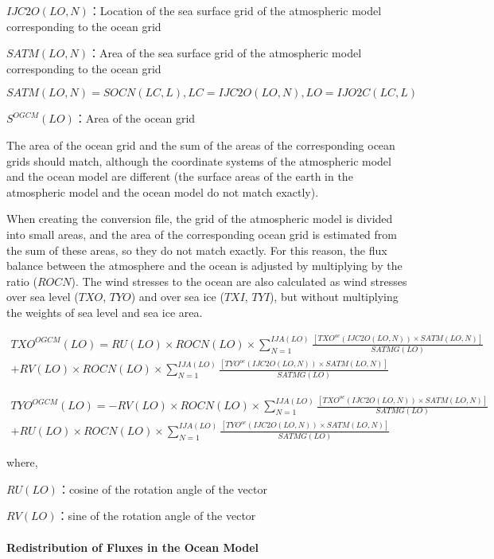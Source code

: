 \(IJC2O(LO,N)\)：Location of the sea surface grid of the atmospheric
model corresponding to the ocean grid

\(SATM(LO,N)\)：Area of the sea surface grid of the atmospheric model
corresponding to the ocean grid

\(SATM(LO,N)=SOCN(LC,L),LC=IJC2O(LO,N),LO=IJO2C(LC,L)\)

\(S^{OGCM}(LO)\)：Area of the ocean grid

The area of the ocean grid and the sum of the areas of the corresponding
ocean grids should match, although the coordinate systems of the
atmospheric model and the ocean model are different (the surface areas
of the earth in the atmospheric model and the ocean model do not match
exactly).

When creating the conversion file, the grid of the atmospheric model is
divided into small areas, and the area of the corresponding ocean grid
is estimated from the sum of these areas, so they do not match exactly.
For this reason, the flux balance between the atmosphere and the ocean
is adjusted by multiplying by the ratio (\(ROCN\)). The wind stresses to
the ocean are also calculated as wind stresses over sea level (\(TXO\),
\(TYO\)) and over sea ice (\(TXI\), \(TYI\)), but without multiplying
the weights of sea level and sea ice area.

\begin{eqnarray} TXO^{OGCM}(LO)=RU(LO) \times ROCN(LO) \times \sum_{N=1}^{IJA(LO)} \frac{[TXO^{oc}(IJC2O(LO,N)) \times SATM(LO,N)]}{SATMG(LO)} \\ + RV(LO) \times ROCN(LO) \times \sum_{N=1}^{IJA(LO)}\frac{[TYO^{oc}(IJC2O(LO,N)) \times SATM(LO,N)]}{SATMG(LO)} \end{eqnarray}

\begin{eqnarray} TYO^{OGCM}(LO)=-RV(LO) \times ROCN(LO) \times \sum_{N=1}^{IJA(LO)} \frac{[TXO^{oc}(IJC2O(LO,N)) \times SATM(LO,N)]}{SATMG(LO)} \\ + RU(LO) \times ROCN(LO) \times \sum_{N=1}^{IJA(LO)}\frac{[TYO^{oc}(IJC2O(LO,N)) \times SATM(LO,N)]}{SATMG(LO)} \end{eqnarray}

where,

\(RU(LO)\)：cosine of the rotation angle of the vector

\(RV(LO)\)：sine of the rotation angle of the vector

\hypertarget{redistribution-of-fluxes-in-the-ocean-model}{%
\paragraph{Redistribution of Fluxes in the Ocean
Model}\label{redistribution-of-fluxes-in-the-ocean-model}}

